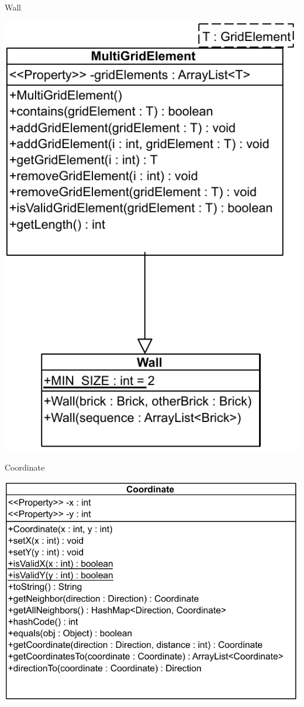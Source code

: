 \documentclass[11pt,t]{beamer}
\begin{document}
\begin{frame}{Wall}
\begin{center}
\includegraphics[scale=0.4]{images/wall}
\end{center}
\end{frame}

\begin{frame}{Coordinate}
\begin{center}
\includegraphics[scale=0.5]{images/coordinate}
\end{center}
\end{frame}
\end{document}
